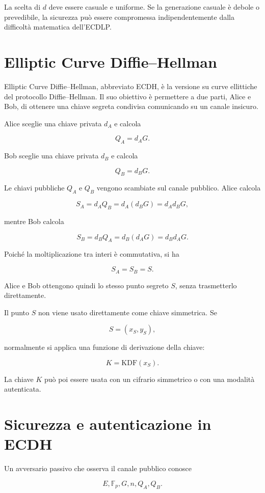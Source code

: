 \documentclass[12pt,a4paper,oneside]{report}
\begin{document}
La scelta di \(d\) deve essere casuale e uniforme. Se la generazione casuale è debole o prevedibile, la sicurezza può essere compromessa indipendentemente dalla difficoltà matematica dell'ECDLP.

\section{Elliptic Curve Diffie--Hellman}

Elliptic Curve Diffie--Hellman, abbreviato ECDH, è la versione su curve ellittiche del protocollo Diffie--Hellman. Il suo obiettivo è permettere a due parti, Alice e Bob, di ottenere una chiave segreta condivisa comunicando su un canale insicuro.

Alice sceglie una chiave privata \(d_A\) e calcola

\[
Q_A=d_A G.
\]

Bob sceglie una chiave privata \(d_B\) e calcola

\[
Q_B=d_B G.
\]

Le chiavi pubbliche \(Q_A\) e \(Q_B\) vengono scambiate sul canale pubblico. Alice calcola

\[
S_A=d_A Q_B=d_A(d_B G)=d_A d_B G,
\]

mentre Bob calcola

\[
S_B=d_B Q_A=d_B(d_A G)=d_B d_A G.
\]

Poiché la moltiplicazione tra interi è commutativa, si ha

\[
S_A=S_B=S.
\]

Alice e Bob ottengono quindi lo stesso punto segreto \(S\), senza trasmetterlo direttamente.

Il punto \(S\) non viene usato direttamente come chiave simmetrica. Se

\[
S=(x_S,y_S),
\]

normalmente si applica una funzione di derivazione della chiave:

\[
K=\mathrm{KDF}(x_S).
\]

La chiave \(K\) può poi essere usata con un cifrario simmetrico o con una modalità autenticata.

\section{Sicurezza e autenticazione in ECDH}

Un avversario passivo che osserva il canale pubblico conosce

\[
E,\mathbb{F}_p,G,n,Q_A,Q_B.
\]
\end{document}
